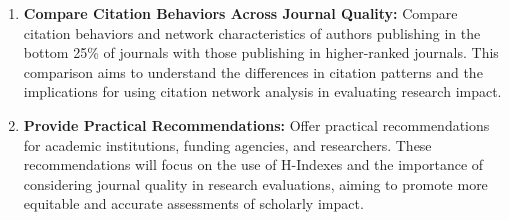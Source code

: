\begin{enumerate}
      \item \textbf{Compare Citation Behaviors Across Journal Quality:} Compare citation behaviors and network characteristics
            of authors publishing in the bottom 25\% of journals with those publishing in higher-ranked journals.
            This comparison aims to understand the differences in citation patterns and the implications for using
            citation network analysis in evaluating research impact.
      \item \textbf{Provide Practical Recommendations:} Offer practical recommendations for academic institutions,
            funding agencies, and researchers. These recommendations will focus on the use of H-Indexes and the importance of
            considering journal quality in research evaluations, aiming to promote more equitable and accurate assessments of scholarly impact.
\end{enumerate}

